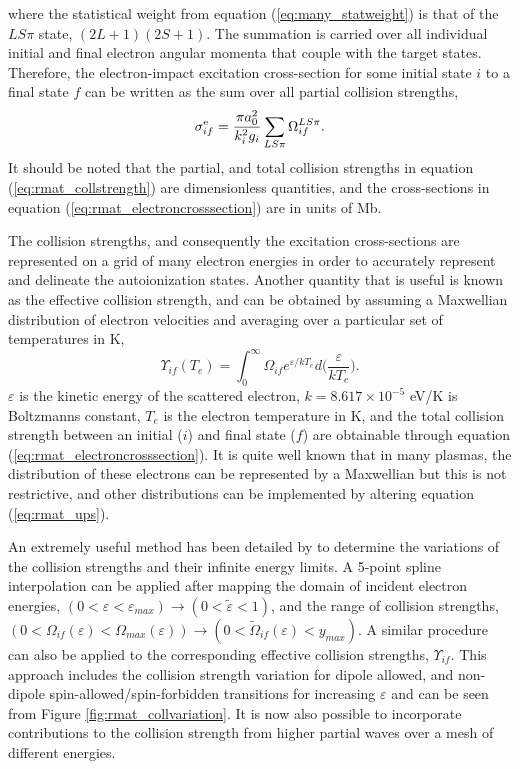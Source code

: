 where the statistical weight from equation (\ref{eq:many_statweight}) is that of the $LS\pi$ state, $(2L+1)(2S+1)$. The summation is carried over all individual initial and final electron angular momenta that couple with the target states. Therefore, the electron-impact excitation cross-section for some initial state $i$ to a final state $f$ can be written as the sum over all partial collision strengths,
\begin{equation}\label{eq:rmat_electroncrosssection}
\sigma^{{\rm e}}_{if} = \frac{\pi a_0^2}{k_i^2g_i}\sum_{LS\pi}\Omega_{if}^{LS\pi}.
\end{equation}
It should be noted that the partial, and total collision strengths in equation (\ref{eq:rmat_collstrength}) are dimensionless quantities, and the cross-sections in equation (\ref{eq:rmat_electroncrosssection}) are in units of Mb.

The collision strengths, and consequently the excitation cross-sections are represented on a grid of many electron energies in order to accurately represent and delineate the autoionization states. Another quantity that is useful is known as the effective collision strength, and can be obtained by assuming a Maxwellian distribution of electron velocities and averaging over a particular set of temperatures in K,
\begin{equation}\label{eq:rmat_ups}
\Upsilon_{if}(T_e) = \int^{\infty}_0 \Omega_{if}e^{\varepsilon/kT_e}d\Big(\frac{\varepsilon}{kT_e}\Big).
\end{equation}
$\varepsilon$ is the kinetic energy of the scattered electron, $k = 8.617\times 10^{-5}$ eV/K is Boltzmanns constant, $T_e$ is the electron temperature in K, and the total collision strength between an initial ($i$) and final state ($f$) are obtainable through equation (\ref{eq:rmat_electroncrosssection}). It is quite well known that in many plasmas, the distribution of these electrons can be represented by a Maxwellian \citep{1947ApJ...105..131B} but this is not restrictive, and other distributions can be implemented by altering equation (\ref{eq:rmat_ups}).

An extremely useful method has been detailed by \citet{1992A&A...254..436B} to determine the variations of the collision strengths and their infinite energy limits. A 5-point spline interpolation can be applied after mapping the domain of incident electron energies, $(0<\varepsilon < \varepsilon_{max}) \rightarrow (0<\tilde{\varepsilon}<1)$, and the range of collision strengths,  $(0<\Omega_{if}(\varepsilon) < \Omega_{max}(\varepsilon)) \rightarrow (0<\tilde{\Omega}_{if}(\varepsilon)<y_{max})$. A similar procedure can also be applied to the corresponding effective collision strengths, $\Upsilon_{if}$. This approach includes the collision strength variation for dipole allowed, and non-dipole spin-allowed/spin-forbidden transitions for increasing $\varepsilon$ and can be seen from Figure \ref{fig:rmat_collvariation}. It is now also possible to incorporate contributions to the collision strength from higher partial waves over a mesh of different energies.

